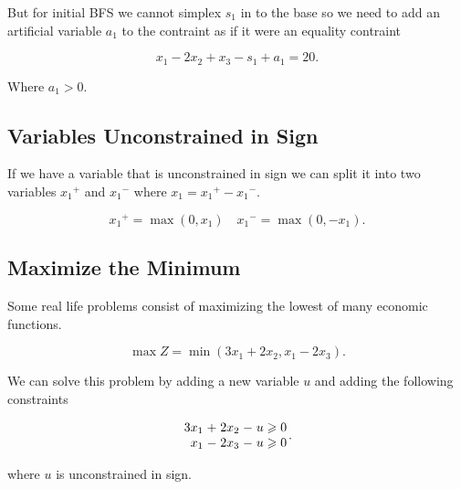 \documentclass{report}
\begin{document}
But for initial BFS we cannot simplex $s_1$ in to the base so we need to add an artificial variable $a_1$ to the contraint as if it were an equality contraint

\[
	x_1-2x_2+x_3-s_1+a_1=20
	.\]

Where $a_1>0$.

\subsection{Variables Unconstrained in Sign}

If we have a variable that is unconstrained in sign we can split it into two variables ${x_1}^+$ and ${x_1}^-$ where $x_1={x_1}^+-{x_1}^-$.

\[
	{x_1}^+ = \max(0,x_1) \quad {x_1}^- = \max(0,-x_1)
	.\]

\subsection{Maximize the Minimum}

Some real life problems consist of maximizing the lowest of many economic functions.

\[
	\max Z = \min(3x_1+2x_2, x_1-2x_3)
	.\]

We can solve this problem by adding a new variable $u$ and adding the following constraints

\[
	\arraycolsep=1.4pt
	\begin{array}{rrrrrrr}
		3x_1 & + & 2x_2 & - & u & \geq & 0 \\
		x_1  & - & 2x_3 & - & u & \geq & 0
	\end{array}
	.\]

where $u$ is unconstrained in sign.

%
%
%
%
%
%
%
%
%
%
%
\end{document}
